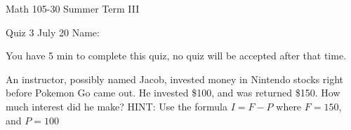 \documentclass[11pt,epsfig]{article}
\begin{document}
Math 105-30 Summer Term III 

Quiz 3 July 20 \hspace{1.9in} {Name:} {\underline {\hspace{3.5in}}}
\vspace{2pc}

You have 5 min to complete this quiz, no quiz will be accepted after that time. 
\vspace{2pc}

\begin{problem}{25}
An instructor, possibly named Jacob, invested money in Nintendo stocks right before Pokemon Go came out. He invested \$100, and was returned \$150. How much interest did he make?
\newline
HINT: Use the formula $I=F-P$ where $ F=150$, and $P=100$

\vfill
\end{problem}



\showpoints
\end{document}

